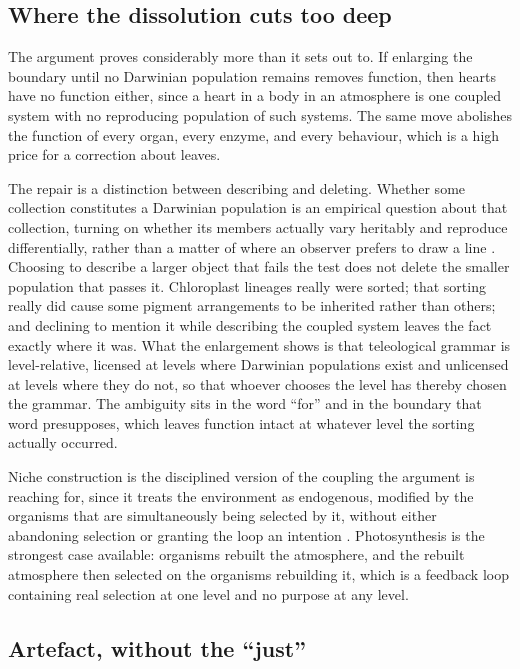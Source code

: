 \subsection{Where the dissolution cuts too deep}

The argument proves considerably more than it sets out to. If enlarging the boundary until no Darwinian population remains removes function, then hearts have no function either, since a heart in a body in an atmosphere is one coupled system with no reproducing population of such systems. The same move abolishes the function of every organ, every enzyme, and every behaviour, which is a high price for a correction about leaves.

The repair is a distinction between describing and deleting. Whether some collection constitutes a Darwinian population is an empirical question about that collection, turning on whether its members actually vary heritably and reproduce differentially, rather than a matter of where an observer prefers to draw a line \citep{godfreysmith2009,okasha2006}. Choosing to describe a larger object that fails the test does not delete the smaller population that passes it. Chloroplast lineages really were sorted; that sorting really did cause some pigment arrangements to be inherited rather than others; and declining to mention it while describing the coupled system leaves the fact exactly where it was. What the enlargement shows is that teleological grammar is level-relative, licensed at levels where Darwinian populations exist and unlicensed at levels where they do not, so that whoever chooses the level has thereby chosen the grammar. The ambiguity sits in the word ``for'' and in the boundary that word presupposes, which leaves function intact at whatever level the sorting actually occurred.

Niche construction is the disciplined version of the coupling the argument is reaching for, since it treats the environment as endogenous, modified by the organisms that are simultaneously being selected by it, without either abandoning selection or granting the loop an intention \citep{odlingsmee2003}. Photosynthesis is the strongest case available: organisms rebuilt the atmosphere, and the rebuilt atmosphere then selected on the organisms rebuilding it, which is a feedback loop containing real selection at one level and no purpose at any level.

\subsection{Artefact, without the ``just''}


